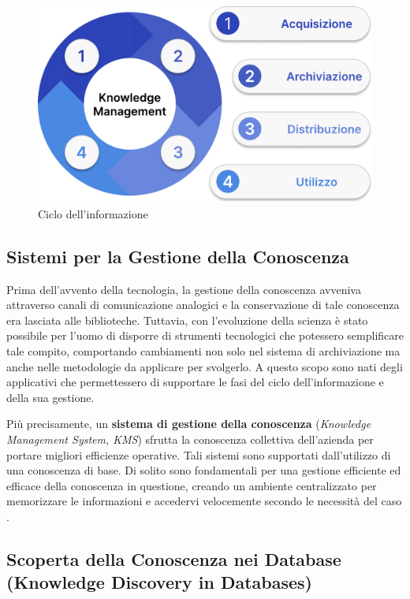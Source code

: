 \begin{figure}[H]
    \centering
    \includegraphics[width=0.8\linewidth]{figure//capitolo_3/Knowledge Management Process.pdf}
    \caption{Ciclo dell'informazione}
    \label{fig:Knowledge Management Process}
\end{figure}

\subsection{Sistemi per la Gestione della Conoscenza}

Prima dell'avvento della tecnologia, la gestione della conoscenza avveniva attraverso canali di comunicazione analogici e la conservazione di tale conoscenza era lasciata alle biblioteche. Tuttavia, con l'evoluzione della scienza è stato possibile per l'uomo di disporre di strumenti tecnologici che potessero semplificare tale compito, comportando cambiamenti non solo nel sistema di archiviazione ma anche nelle metodologie da applicare per svolgerlo. A questo scopo sono nati degli applicativi che permettessero di supportare le fasi del ciclo dell'informazione e della sua gestione.

Più precisamente, un \textbf{sistema di gestione della conoscenza} (\textit{Knowledge Management System, KMS}) sfrutta la conoscenza collettiva dell'azienda per portare migliori efficienze operative. Tali sistemi sono supportati dall'utilizzo di una conoscenza di base. Di solito sono fondamentali per una gestione efficiente ed efficace della conoscenza in questione, creando un ambiente centralizzato per memorizzare le informazioni e accedervi velocemente secondo le necessità del caso \cite{ibm_knowledge_management}.

\subsection{Scoperta della Conoscenza nei Database (Knowledge Discovery in Databases)}

